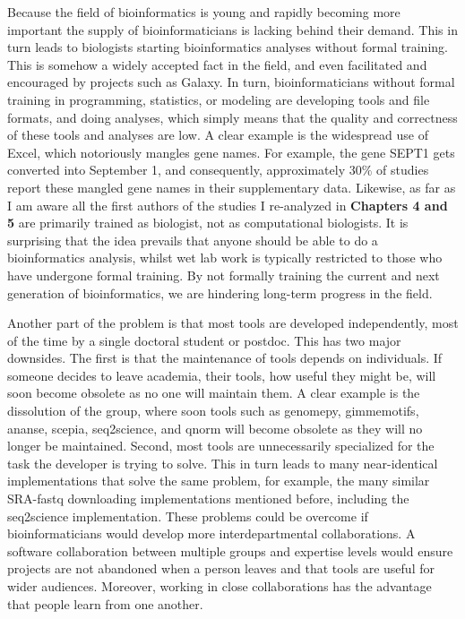 Because the field of bioinformatics is young and rapidly becoming more important the supply of bioinformaticians is lacking behind their demand. This in turn leads to biologists starting bioinformatics analyses without formal training. This is somehow a widely accepted fact in the field, and even facilitated and encouraged by projects such as Galaxy\cite{galaxy}. In turn, bioinformaticians without formal training in programming, statistics, or modeling are developing tools and file formats, and doing analyses, which simply means that the quality and correctness of these tools and analyses are low. A clear example is the widespread use of Excel, which notoriously mangles gene names\cite{Zeeberg2004}. For example, the gene SEPT1 gets converted into September 1, and consequently, approximately $30\%$ of studies report these mangled gene names in their supplementary data\cite{Abeysooriya2021}. Likewise, as far as I am aware all the first authors of the studies I re-analyzed in \textbf{Chapters 4 and 5} are primarily trained as biologist, not as computational biologists. It is surprising that the idea prevails that anyone should be able to do a bioinformatics analysis, whilst wet lab work is typically restricted to those who have undergone formal training. By not formally training the current and next generation of bioinformatics, we are hindering long-term progress in the field.

Another part of the problem is that most tools are developed independently, most of the time by a single doctoral student or postdoc. This has two major downsides. The first is that the maintenance of tools depends on individuals. If someone decides to leave academia, their tools, how useful they might be, will soon become obsolete as no one will maintain them. A clear example is the dissolution of the  group, where soon tools such as genomepy\cite{genomepy}, gimmemotifs\cite{Bruse_2018}, ananse\cite{Xu_2020}, scepia, seq2science\cite{seq2science}, and qnorm\cite{qnorm} will become obsolete as they will no longer be maintained. Second, most tools are unnecessarily specialized for the task the developer is trying to solve. This in turn leads to many near-identical implementations that solve the same problem, for example, the many similar SRA-fastq downloading implementations mentioned before, including the seq2science implementation. These problems could be overcome if bioinformaticians would develop more interdepartmental collaborations. A software collaboration between multiple groups and expertise levels would ensure projects are not abandoned when a person leaves and that tools are useful for wider audiences. Moreover, working in close collaborations has the advantage that people learn from one another.

